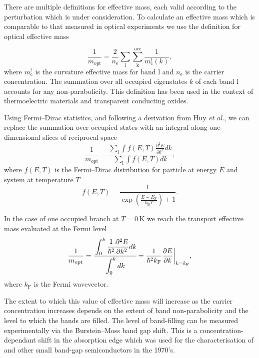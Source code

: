There are multiple definitions for effective mass, each valid according to the perturbation which is under consideration.
To calculate an effective mass which is comparable to that measured in optical experiments we use the definition for optical effective mass

\begin{equation}
\frac{1}{m_{\text{opt}}} = \frac{2}{n_{\text{e}}}\sum_{\text{l}}\sum_{\text{k}}^{\text{occ}} \frac{1}{m_\text{c}^{\text{l}}(k)},
\end{equation}
where $m_{\text{c}}^{\text{l}}$ is the curvature effective mass for band $\text{l}$ and $n_{\text{e}}$ is the carrier concentration. 
The summation over all occupied eigenstates $k$ of each band l accounts for any non-parabolicity. 
This definition has been used in the context of thermoelectric materials\autocite{Gibbs2017} and transparent conducting oxides.\autocite{Hautier2013} 

Using Fermi--Dirac statistics, and following a derivation from Huy \textit{et al.},\autocite{Huy2011} we can replace the summation over occupied states with an integral along one-dimensional slices of reciprocal space
\begin{equation} \label{opt2}
\frac{1}{m_{\text{opt}}} = \frac{\displaystyle\sum_{\text{l}} \displaystyle\int f(E,T) \frac{\partial^2 E}{\partial k^2} dk}{\displaystyle\sum_{\text{l}} \displaystyle\int f(E,T) dk},
\end{equation}
where $f(E,T)$ is the Fermi--Dirac distribution for particle at energy $E$ and system at temperature $T$
\begin{equation} \label{fermidirac}
f(E,T) = \frac{1}{\exp\left(\frac{E-E_{\text{F}}}{k_{\text{B}}T}\right)+1}.
\end{equation}

In the case of one occupied branch at $T=0\,\mathrm{K}$ we reach the transport effective mass evaluated at the Fermi level
\begin{equation} \label{opt}   
\frac{1}{m_{\text{opt}}} = \cfrac{\displaystyle\int_0^{k} \cfrac{1}{\hbar^2}\frac{\partial^2E}{\partial k^2} dk}{\displaystyle\int_0^{k}dk} = \frac{1}{\hbar^2k_{\text{F}}} \frac{\partial E}{\partial k}\biggr\rvert_{k=k_{\text{F}}},
\end{equation}
where $k_{\text{F}}$ is the Fermi wavevector.

The extent to which this value of effective mass will increase as the carrier concentration increases depends on the extent of band non-parabolicity and the level to which the bands are filled. 
The level of band-filling can be measured experimentally via the Burstein--Moss band gap shift.\autocite{Burstein1954,Moss1954} 
This is a concentration-dependant shift in the absorption edge which was used for the characterisation of  and other small band-gap semiconductors in the 1970's. 

